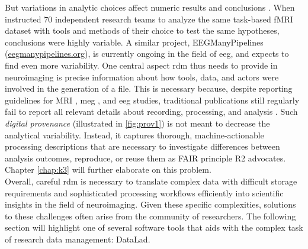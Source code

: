But variations in analytic choices affect numeric results and conclusions \citep{silberzahn2018}.
When \citet{botvinik2020variability} instructed 70 independent research teams to analyze the same task-based \gls{fMRI} dataset with tools and methods of their choice to test the same hypotheses, conclusions were highly variable.
A similar project, EEGManyPipelines (\href{https://eegmanypipelines.org/}{eegmanypipelines.org}), is currently ongoing in the field of \gls{eeg}, and expects to find even more variability.
One central aspect \gls{rdm} thus needs to provide in neuroimaging is precise information about how tools, data, and actors were involved in the generation of a file.
This is necessary because, despite reporting guidelines for \gls{MRI} \citep{nichols2017best}, \gls{meg} \citep{pernet2020issues}, and \gls{eeg} \citep{styles2021towards} studies, traditional publications still regularly fail to report all relevant details about recording, processing, and analysis  \citep[see, e.g.,][]{vsovskic2022better}.
Such \textit{digital provenance} (illustrated in \cref{fig:prov1}) is not meant to decrease the analytical variability.
Instead, it captures thorough, machine-actionable processing descriptions that are necessary to investigate differences between analysis outcomes, reproduce, or reuse them as \gls{FAIR} principle R2 advocates.
Chapter \ref{chap:k3} will further elaborate on this problem.\\
Overall, careful \gls{rdm} is necessary to translate complex data with difficult storage requirements and sophisticated processing workflows efficiently into scientific insights in the field of neuroimaging.
Given these specific complexities, solutions to these challenges often arise from the community of researchers.
The following section will highlight one of several software tools that aids with the complex task of research data management: DataLad.

